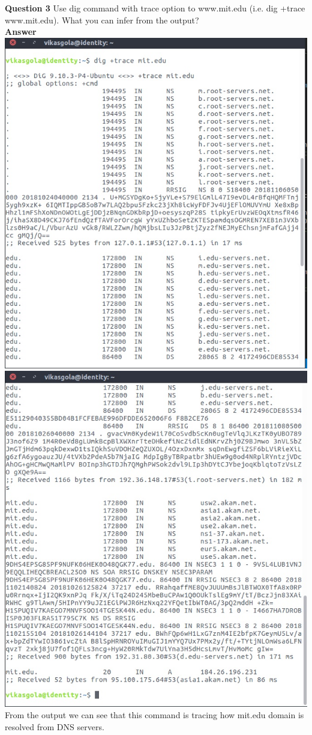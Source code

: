 \documentclass[14pt]{extarticle}
\begin{document}
    \noindent
    \textbf{\large Question 3}
    Use dig command with trace option to www.mit.edu (i.e. dig +trace www.mit.edu). What you can infer from the output?\\[10pt]
    \textbf{\large Answer}
    \\
    \includegraphics[scale=0.65]{4_3_1}\\[10pt]
    \includegraphics[scale=0.65]{4_3_2}\\[10pt]
    From the output we can see that this command is tracing how mit.edu domain is resolved from DNS servers.
    \vspace{1cm}
\end{document}
